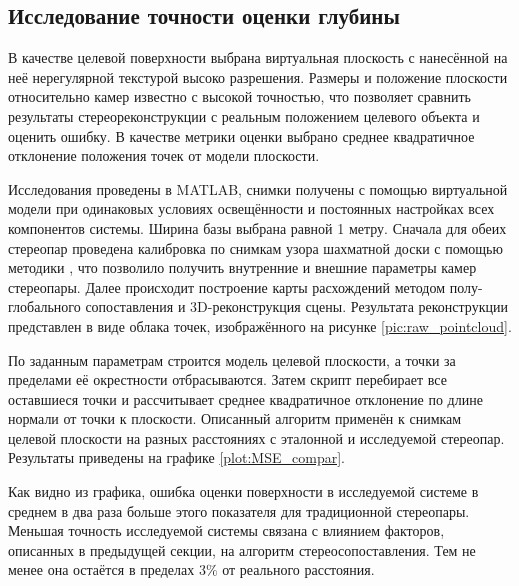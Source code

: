 
\subsection{Исследование точности оценки глубины}  %

В качестве целевой поверхности выбрана виртуальная плоскость с нанесённой на неё нерегулярной текстурой высоко разрешения. Размеры и
положение плоскости относительно камер известно с высокой точностью, что позволяет сравнить результаты стереореконструкции
с реальным положением целевого объекта и оценить ошибку. В качестве метрики оценки выбрано среднее квадратичное отклонение
положения точек от модели плоскости. 

Исследования проведены в MATLAB, снимки получены с помощью виртуальной модели при  одинаковых условиях освещённости и 
постоянных  настройках всех  компонентов системы.  Ширина базы выбрана равной 1  метру.  Сначала для обеих стереопар 
проведена калибровка по снимкам узора шахматной доски с помощью методики \cite{stereo_calib}, что позволило получить 
внутренние и внешние параметры камер стереопары. %
Далее происходит построение карты расхождений методом полу-глобального  сопоставления \cite{SGBM} и 3D-реконструкция сцены. 
Результата реконструкции представлен  в виде облака точек,  изображённого на рисунке \ref{pic:raw_pointcloud}.

По заданным параметрам строится модель целевой плоскости, а точки за пределами её окрестности отбрасываются. %
Затем скрипт перебирает все оставшиеся точки и рассчитывает среднее квадратичное отклонение по длине нормали от 
точки к плоскости. 
Описанный алгоритм применён к снимкам целевой плоскости на разных расстояниях с эталонной и исследуемой стереопар.
Результаты приведены на графике \ref{plot:MSE_compar}.


Как видно из графика, ошибка оценки поверхности в исследуемой системе в среднем в два раза больше этого показателя для
традиционной стереопары. Меньшая точность исследуемой системы связана с влиянием факторов, описанных в предыдущей секции,
на алгоритм стереосопоставления.  Тем не менее она остаётся в пределах $3\%$ от реального расстояния.  %


%